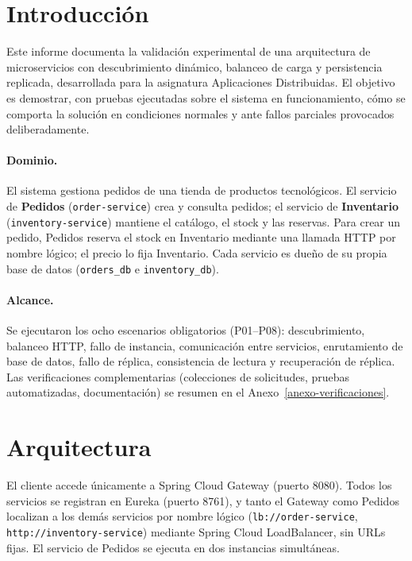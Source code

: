 \documentclass[
  spanish,
  a4paper,
  11pt
]{article}
\begin{document}
\newpage
\thispagestyle{fancy}
{
  \hypersetup{linkcolor=DarkNavy}
  \tableofcontents
}
\newpage

\section{Introducción}\label{introduccion}

Este informe documenta la validación experimental de una arquitectura de
microservicios con descubrimiento dinámico, balanceo de carga y persistencia
replicada, desarrollada para la asignatura Aplicaciones Distribuidas. El
objetivo es demostrar, con pruebas ejecutadas sobre el sistema en
funcionamiento, cómo se comporta la solución en condiciones normales y ante
fallos parciales provocados deliberadamente.

\paragraph{Dominio.} El sistema gestiona pedidos de una tienda de productos
tecnológicos. El servicio de \textbf{Pedidos} (\texttt{order-service}) crea y
consulta pedidos; el servicio de \textbf{Inventario}
(\texttt{inventory-service}) mantiene el catálogo, el stock y las reservas.
Para crear un pedido, Pedidos reserva el stock en Inventario mediante una
llamada HTTP por nombre lógico; el precio lo fija Inventario. Cada servicio
es dueño de su propia base de datos (\texttt{orders\_db} e
\texttt{inventory\_db}).

\paragraph{Alcance.} Se ejecutaron los ocho escenarios obligatorios
(P01--P08): descubrimiento, balanceo HTTP, fallo de instancia, comunicación
entre servicios, enrutamiento de base de datos, fallo de réplica,
consistencia de lectura y recuperación de réplica. Las verificaciones
complementarias (colecciones de solicitudes, pruebas automatizadas,
documentación) se resumen en el Anexo~\ref{anexo-verificaciones}.

\section{Arquitectura}\label{arquitectura}

El cliente accede únicamente a Spring Cloud Gateway (puerto 8080). Todos los
servicios se registran en Eureka (puerto 8761), y tanto el Gateway como
Pedidos localizan a los demás servicios por nombre lógico
(\texttt{lb://order-service}, \texttt{http://inventory-service}) mediante
Spring Cloud LoadBalancer, sin URLs fijas. El servicio de Pedidos se ejecuta
en dos instancias simultáneas.
\end{document}
